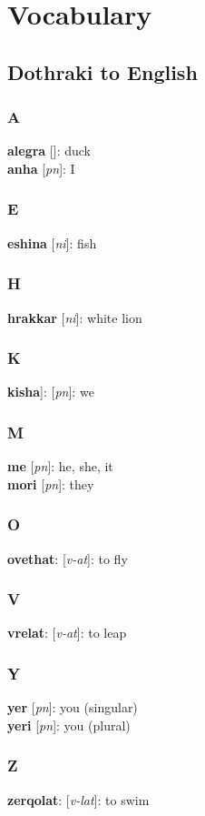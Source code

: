 \chapter{Vocabulary}
\section*{Dothraki to English}
\begin{multicols}{2}
\subsection*{A}
\textbf{alegra} []: duck \\
\textbf{anha} [\textit{pn}]: I \\
\subsection*{E}
\textbf{eshina} [\textit{ni}]: fish \\
\subsection*{H}
\textbf{hrakkar} [\textit{ni}]: white lion \\
\subsection*{K}
\textbf{kisha}]: [\textit{pn}]: we \\
\subsection*{M}
\textbf{me} [\textit{pn}]: he, she, it \\
\textbf{mori} [\textit{pn}]: they \\
\subsection*{O}
\textbf{ovethat}: [\textit{v-at}]: to fly \\
\subsection*{V}
\textbf{vrelat}: [\textit{v-at}]: to leap \\
\subsection*{Y}
\textbf{yer} [\textit{pn}]: you (singular) \\
\textbf{yeri} [\textit{pn}]: you (plural) \\
\subsection*{Z}
\textbf{zerqolat}: [\textit{v-lat}]: to swim \\
\end{multicols}
\pagebreak
